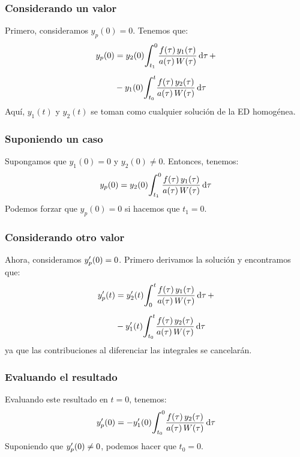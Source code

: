 \documentclass[12pt]{beamer}
\begin{document}
\begin{frame}
\frametitle{Considerando un valor}
Primero, consideramos $y_{p} (0) = 0$. \pause Tenemos que:
\pause
\begin{eqnarray}
\begin{aligned}
y_{p} (0) &= y_{2} (0) \scaleint{6ex}_{\bs t_{1}}^{0} \dfrac{f (\tau) \, y_{1} (\tau)}{a (\tau) \, W (\tau)} \dd{\tau} + \\[0.5em]
&- y_{1} (0) \scaleint{6ex}_{\bs t_{0}}^{t} \dfrac{f (\tau) \, y_{2} (\tau)}{a (\tau) \, W (\tau)} \dd{\tau}
\end{aligned}
\label{eq:ecuacion_07_15}
\end{eqnarray}
Aquí, $y_{1} (t)$ y $y_{2} (t)$ se toman como cualquier solución de la ED homogénea.
\end{frame}
\begin{frame}
\frametitle{Suponiendo un caso}
Supongamos que $y_{1} (0) = 0$ y $y_{2} (0) \neq 0$. \pause Entonces, tenemos:
\pause
\begin{align}
y_{p} (0) = y_{2} (0) \scaleint{6ex}_{\bs t_{1}}^{0} \dfrac{f (\tau) \, y_{1} (\tau)}{a (\tau) \, W (\tau)} \dd{\tau}
\label{eq:ecuacion_07_16}
\end{align}
\pause
Podemos forzar que $y_{p} (0) = 0$ si hacemos que $t_{1} = 0$.
\end{frame}
\begin{frame}
\frametitle{Considerando otro valor}
Ahora, consideramos ${y}^{\prime}_{p} (0) = 0$. \pause Primero derivamos la solución y encontramos que:
\pause
\begin{eqnarray}
\begin{aligned}
\pderivada{y}_{p} (t) &= \pderivada{y}_{2} (t) \scaleint{6ex}_{\bs 0}^{t} \dfrac{f (\tau) \, y_{1} (\tau)}{a (\tau) \, W (\tau)} \dd{\tau} + \\[0.5em]
&- \pderivada{y}_{1} (t) \scaleint{6ex}_{\bs t_{0}}^{t} \dfrac{f (\tau) \, y_{2} (\tau)}{a (\tau) \, W (\tau)} \dd{\tau}
\end{aligned}
\label{eq:ecuacion_07_17}
\end{eqnarray}
ya que las contribuciones al diferenciar las integrales se cancelarán.
\end{frame}
\begin{frame}
\frametitle{Evaluando el resultado}
Evaluando este resultado en $t = 0$, tenemos:
\pause
\begin{align}
\pderivada{y}_{p} (0) = - \pderivada{y}_{1} (0) \scaleint{6ex}_{\bs t_{0}}^{0} \dfrac{f (\tau) \, y_{2} (\tau)}{a (\tau) \, W (\tau)} \dd{\tau}
\label{eq:ecuacion_07_18}
\end{align}
Suponiendo que ${y}^{\prime}_{p} (0) \neq 0$, podemos hacer que $t_{0} = 0$.
\end{frame}
\end{document}
